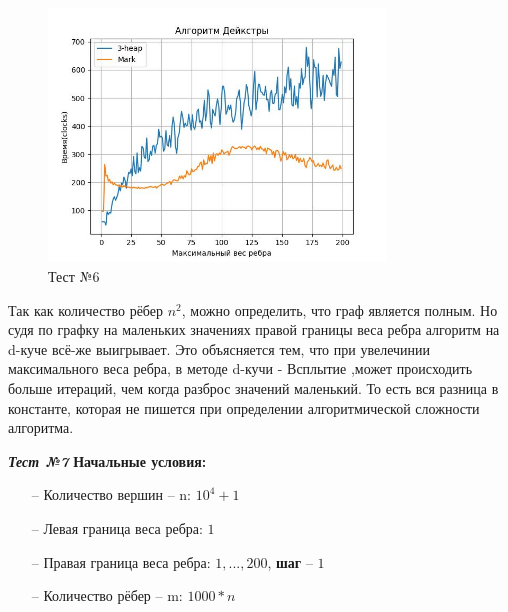 \begin{text}
\begin{center}
\end{center}
\begin{figure}[h]
  \centering
  \includegraphics[width=0.8\textwidth]{pictures/6.jpeg}
  \caption{Тест №6}
  \label{fig:pict_6}
\end{figure}

Так как количество рёбер $n^2$, можно определить, что граф является полным. Но судя по графку на маленьких значениях правой границы веса ребра алгоритм на d-куче всё-же выигрывает. Это объясняется тем, что при увелечинии максимального веса ребра, в методе d-кучи - \guillemotleft Всплытие \guillemotright ,может происходить больше итераций, чем когда разброс значений маленький. То есть вся разница в константе, которая не пишется при определении алгоритмической сложности алгоритма.\\
\newpage

\begin{center}
\textbf{\textit{Тест №7}}
\textbf{Начальные условия:}

\begin{enumerate}
	\item[--] Количество вершин -- n: $10^4 + 1$
	\item[--] Левая граница веса ребра: $1$
	\item[--] Правая граница веса ребра: $1,...,200$, \textbf{шаг} -- $1$
	\item[--] Количество рёбер -- m: $1000 * n$
\end{enumerate}


\end{center}
\end{text}
